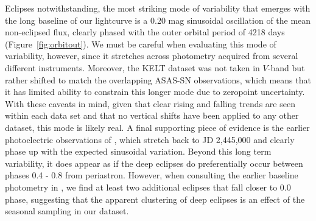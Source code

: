 \documentclass[twocolumn]{aastex61}
\newcommand{\todo}[1]{ \textcolor{red}{#1}}
\begin{document}
Eclipses notwithstanding, the most striking mode of variability that emerges with the long baseline of our lightcurve is a 0.20 mag sinusoidal oscillation of the mean non-eclipsed flux, clearly phased with the outer orbital period of 4218 days (Figure~\ref{fig:orbitout}). We must be careful when evaluating this mode of variability, however, since it stretches across photometry acquired from several different instruments. Moreover, the KELT dataset was not taken in $V$-band but rather shifted to match the overlapping ASAS-SN observations, which means that it has limited ability to constrain this longer mode due to zeropoint uncertainty. With these caveats in mind, given that clear rising and falling trends are seen within each data set and that no vertical shifts have been applied to any other dataset, this mode is likely real. A final supporting piece of evidence is the earlier photoelectric observations of \citet{shevchenko98}, which stretch back to JD 2,445,000 and clearly phase up with the expected sinusoidal variation.
Beyond this long term variability, it does appear as if the deep eclipses do preferentially occur between phases 0.4 - 0.8 from periastron. However, when consulting the earlier baseline photometry in \citet{shevchenko98}, we find at least two additional eclipses that fall closer to 0.0 phase, suggesting that the apparent clustering of deep eclipses is an effect of the seasonal sampling in our dataset.

\end{document}
